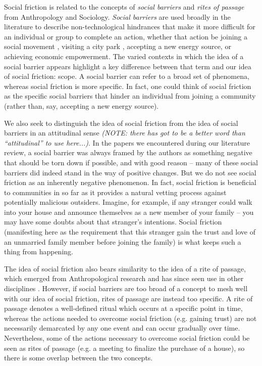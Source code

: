 \documentclass[sigconf,authordraft]{acmart}
\begin{document}
Social friction is related to the concepts of \textit{social barriers} and \textit{rites of passage} from Anthropology and Sociology. {\itshape Social barriers} are used broadly in the literature to describe non-technological hindrances that make it more difficult for an individual or group to complete an action, whether that action be joining a social movement \cite{klandermans1987potentials}, visiting a city park \cite{cutts2009city}, accepting a new energy source\cite{pasqualetti2011social}, or achieving economic empowerment\cite{woolcock2000removing}. The varied contexts in which the idea of a social barrier appears highlight a key difference between that term and our idea of social friction: scope. A social barrier can refer to a broad set of phenomena, whereas social friction is more specific. In fact, one could think of social friction as the specific social barriers that hinder an individual from joining a community (rather than, say, accepting a new energy source). 

We also seek to distinguish the idea of social friction from the idea of social barriers in an attitudinal sense \textit{(NOTE: there has got to be a better word than ``attitudinal'' to use here...)}. In the papers we encountered during our literature review, a social barrier was always framed by the authors as something negative that should be torn down if possible, and with good reason -- many of these social barriers did indeed stand in the way of positive changes. But we do not see social friction as an inherently negative phenomenon. In fact, social friction is beneficial to communities in so far as it provides a natural vetting process against potentially malicious outsiders. Imagine, for example, if any stranger could walk into your house and announce themselves as a new member of your family -- you may have some doubts about that stranger's intentions. Social friction (manifesting here as the requirement that this stranger gain the trust and love of an unmarried family member before joining the family) is what keeps such a thing from happening. 

The idea of social friction also bears similarity to the idea of a rite of passage, which emerged from Anthropological research and has since seen use in other disciplines \cite{blackwell_ROP,guha2011routledge}. However, if social barriers are too broad of a concept to mesh well with our idea of social friction, rites of passage are instead too specific. A rite of passage denotes a well-defined ritual which occurs at a specific point in time, whereas the actions needed to overcome social friction (e.g. gaining trust) are not necessarily demarcated by any one event and can occur gradually over time. Nevertheless, some of the actions necessary to overcome social friction could be seen as rites of passage (e.g. a meeting to finalize the purchase of a house), so there is some overlap between the two concepts. 
\end{document}
